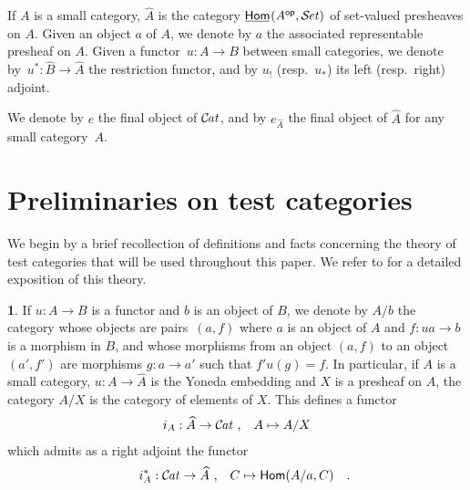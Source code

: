 \documentclass[10pt, english, a4paper, nothms]{amsart}
\theoremstyle{plain}
\theoremstyle{remark}
\theoremstyle{definition}
\newtheorem{paragr}[theorem]{}
\numberwithin{equation}{theorem}
\newcommand{\Set}{{\mathcal{S}\mspace{-2.mu}\it{et}}}
\newcommand{\Cat}{{\mathcal{C}\mspace{-2.mu}\it{at}}}
\newcommand{\Hom}{\operatorname{\mathsf{Hom}}}
\newcommand{\Homi}{\operatorname{\kern.5truept\underline{\kern-.5truept\mathsf{Hom}\kern-.5truept}\kern1truept}}
\DeclareMathOperator{\op}{\mathsf{op}}
\newcommand{\pref}[1]{{\widehat{ #1 }}}
\newcommand{\tranche}[2]{#1/{#2}}
\newcommand{\mdvirg}{\text{ ,}\hspace{10pt}}
\newcommand\zbox[1]{\makebox[0pt][l]{#1}}
\newcommand\pbox[1]{\zbox{\quad #1}} %
\begin{document}
If $A$ is a small category, $\pref{A}$ is the category $\Homi({A}^{\op}, \Set)$
of set-valued presheaves on $A$. Given an object $a$ of $A$, we denote by $a$
the associated representable presheaf on $A$. Given a functor~$u: A \to B$
between small categories, we denote by~$u^* : \pref{B} \to \pref{A}$ the
restriction functor, and by $u_!$ (resp.~$u_*$) its left (resp.~right) adjoint.

We denote by $e$ the final object of $\Cat$, and by $e_{\pref{A}}$ the final
object of $\pref{A}$ for any small category~$A$.

\section{Preliminaries on test categories}
\label{sec:testCategories}

We begin by a brief recollection of definitions and facts concerning the theory
of test categories that will be used throughout this paper. We refer to
\cite{maltsiniotis2005} for a detailed exposition of this theory.

\begin{paragr}
If $u: A \to B$ is a functor and $b$ is an object of $B$, we denote by
$\tranche{A}{b}$ the category whose objects are pairs~$(a,f)$ where $a$ is an
object of $A$ and $f: ua \to b$ is a morphism in $B$, and whose morphisms from
an object $(a,f)$ to an object $(a',f')$ are morphisms $g: a \to a'$ such that
$f'u(g)=f$. In particular, if $A$ is a small category, $u: A \to \pref{A}$ is
the Yoneda embedding and $X$ is a presheaf on $A$, the category
$\tranche{A}{X}$ is the category of elements of $X$. This defines a
functor 
\begin{align*}
i_A: \pref{A} \to \Cat \mdvirg A \mapsto \tranche{A}{X}
\end{align*}
which admits as a right adjoint the functor 
\[
i_A^*: \Cat \to \pref{A} \mdvirg C \mapsto \Hom(\tranche{A}{a}, C) \pbox{.}
\]
\end{paragr}
\end{document}
